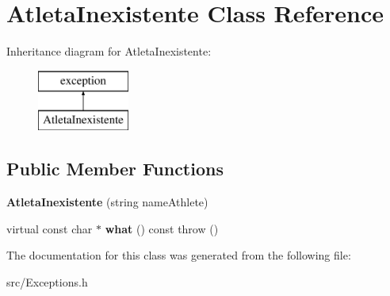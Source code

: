 \hypertarget{class_atleta_inexistente}{}\section{Atleta\+Inexistente Class Reference}
\label{class_atleta_inexistente}
Inheritance diagram for Atleta\+Inexistente\+:\begin{figure}[H]
\begin{center}
\leavevmode
\includegraphics[height=2.000000cm]{class_atleta_inexistente}
\end{center}
\end{figure}
\subsection*{Public Member Functions}
\begin{DoxyCompactItemize}
\item 
\hypertarget{class_atleta_inexistente_aa1e33f37ed7f61ad74f6fdd6bb1d2d79}{}{\bfseries Atleta\+Inexistente} (string name\+Athlete)\label{class_atleta_inexistente_aa1e33f37ed7f61ad74f6fdd6bb1d2d79}

\item 
\hypertarget{class_atleta_inexistente_a845d43b61aab45329431d8cbf2f36f10}{}virtual const char $\ast$ {\bfseries what} () const   throw ()\label{class_atleta_inexistente_a845d43b61aab45329431d8cbf2f36f10}

\end{DoxyCompactItemize}


The documentation for this class was generated from the following file\+:\begin{DoxyCompactItemize}
\item 
src/Exceptions.\+h\end{DoxyCompactItemize}
